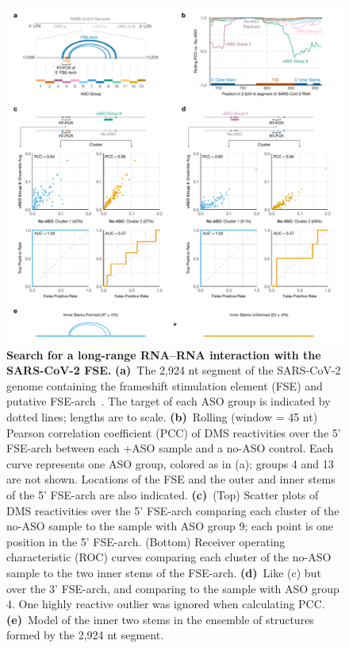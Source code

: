\documentclass[main.tex]{subfiles}
\begin{document}
\begin{figure}[H]
	\includegraphics[width=\textwidth]{../MainFigures/sars2-tile/sars2-tile.pdf}
	\caption{\textbf{Search for a long-range RNA--RNA interaction with the SARS-CoV-2 FSE.} \textbf{(a)}~The 2,924 nt segment of the SARS-CoV-2 genome containing the frameshift stimulation element (FSE) and putative FSE-arch~\cite{Ziv2020}. The target of each ASO group is indicated by dotted lines; lengths are to scale. \textbf{(b)}~Rolling (window = 45 nt) Pearson correlation coefficient (PCC) of DMS reactivities over the 5' FSE-arch between each +ASO sample and a no-ASO control. Each curve represents one ASO group, colored as in (a); groups 4 and 13 are not shown. Locations of the FSE and the outer and inner stems of the 5' FSE-arch are also indicated. \textbf{(c)}~(Top) Scatter plots of DMS reactivities over the 5' FSE-arch comparing each cluster of the no-ASO sample to the sample with ASO group 9; each point is one position in the 5' FSE-arch. (Bottom) Receiver operating characteristic (ROC) curves comparing each cluster of the no-ASO sample to the two inner stems of the FSE-arch. \textbf{(d)}~Like (c) but over the 3' FSE-arch, and comparing to the sample with ASO group 4. One highly reactive outlier was ignored when calculating PCC. \textbf{(e)}~Model of the inner two stems in the ensemble of structures formed by the 2,924 nt segment.}
	\label{tiles}
\end{figure}
\end{document}
